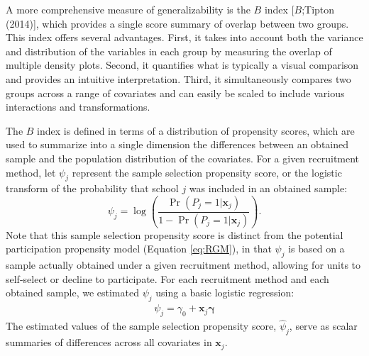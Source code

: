 \documentclass[
  english,
  man,floatsintext]{apa6}
\begin{document}
A more comprehensive measure of generalizability is the \(B\) index {[}\(B\);Tipton (2014){]}, which provides a single score summary of overlap between two groups. This index offers several advantages. First, it takes into account both the variance and distribution of the variables in each group by measuring the overlap of multiple density plots. Second, it quantifies what is typically a visual comparison and provides an intuitive interpretation. Third, it simultaneously compares two groups across a range of covariates and can easily be scaled to include various interactions and transformations.

The \(B\) index is defined in terms of a distribution of propensity scores, which are used to summarize into a single dimension the differences between an obtained sample and the population distribution of the covariates.
For a given recruitment method, let \(\psi_j\) represent the sample selection propensity score, or the logistic transform of the probability that school \(j\) was included in an obtained sample:
\[
\psi_j = \log\left(\frac{\Pr(P_j = 1 | \mathbf{x}_j)}{1 - \Pr(P_j = 1 | \mathbf{x}_j)}\right). 
\]
Note that this sample selection propensity score is distinct from the potential participation propensity model (Equation \eqref{eq:RGM}), in that \(\psi_j\) is based on a sample actually obtained under a given recruitment method, allowing for units to self-select or decline to participate. For each recruitment method and each obtained sample, we estimated \(\psi_j\) using a basic logistic regression:
\begin{align}
\label{eq:PSA}
\psi_j = \gamma_0 + \mathbf{x}_j \boldsymbol\gamma
\end{align}
The estimated values of the sample selection propensity score, \(\hat\psi_j\), serve as scalar summaries of differences across all covariates in \(\mathbf{x}_j\).
\end{document}
